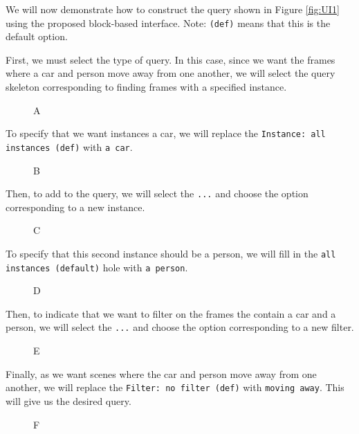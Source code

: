 We will now demonstrate how to construct the query shown in Figure \ref{fig:UI1} using the proposed block-based interface. Note: \texttt{(def)} means that this is the default option.

First, we must select the type of query. In this case, since we want the frames where a car and person move away from one another, we will select the query skeleton corresponding to finding frames with a specified instance.
\begin{figure}[H]
    \caption{A}
    \label{fig:Using1}
\end{figure}
To specify that we want instances a car, we will replace the \texttt{Instance: all instances (def)} with \texttt{a car}.
\begin{figure}[H]
    \caption{B}
    \label{fig:Using2}
\end{figure}
Then, to add to the query, we will select the \texttt{...} and choose the option corresponding to a new instance.
\begin{figure}[H]
    \caption{C}
    \label{fig:Using3}
\end{figure}
To specify that this second instance should be a person, we will fill in the \texttt{all instances (default)} hole with \texttt{a person}.
\begin{figure}[H]
    \caption{D}
    \label{fig:Using4}
\end{figure}
Then, to indicate that we want to filter on the frames the contain a car and a person, we will select the \texttt{...} and choose the option corresponding to a new filter.
\begin{figure}[H]
    \caption{E}
    \label{fig:Using5}
\end{figure}
Finally, as we want scenes where the car and person move away from one another, we will replace the \texttt{Filter: no filter (def)} with \texttt{moving away}. This will give us the desired query.

\begin{figure}[H]
    \caption{F}
    \label{fig:Using6}
\end{figure}
